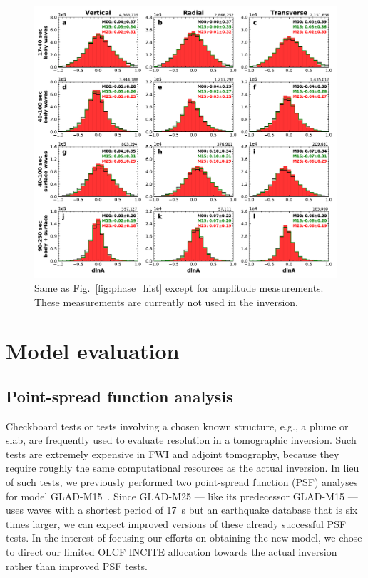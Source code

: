 \begin{figure}
  \centering
  \includegraphics[width=\textwidth]{ch-GLADM25/figures/dlna_histogram.pdf}
  \caption[Histograms of amplitude measurements in all twelve measurement categories]
  {\small{Same as Fig.~\ref{fig:phase_hist} except for amplitude measurements. These measurements are currently not used in the inversion.}}
  \label{fig:amp_hist}
\end{figure}

\section{Model evaluation}
\label{section:evaluation}


\subsection{Point-spread function analysis}

Checkboard tests or tests involving a chosen known structure, e.g., a plume or slab,
are frequently used to evaluate resolution in a tomographic inversion.
Such tests are extremely expensive in FWI and adjoint tomography, because they
require roughly the same computational resources as the actual inversion.
In lieu of such tests, we previously performed two point-spread function (PSF) analyses
for model GLAD-M15~\cite{bozdaug2016global}.
Since GLAD-M25 --- like its predecessor GLAD-M15 --- uses waves with a shortest period of 17~s
but an earthquake database that is six times larger,
we can expect improved versions of these already successful PSF tests.
In the interest of focusing our efforts on obtaining the new model,
we chose to direct our limited OLCF INCITE allocation towards the actual inversion
rather than improved PSF tests.

